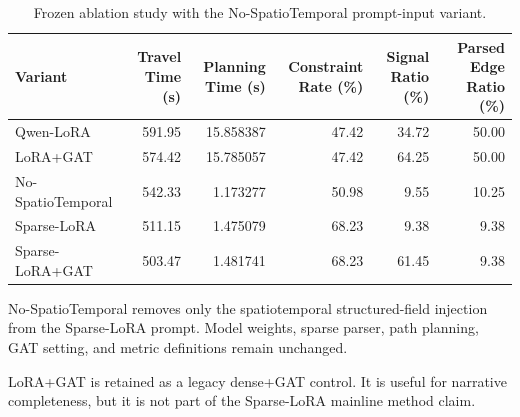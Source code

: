 
\begin{table}[t]
\centering
\caption{Frozen ablation study with the No-SpatioTemporal prompt-input variant.}
\label{tab:table2_ablation}
\small
\begin{threeparttable}
\begin{tabular}{lrrrrr}
\toprule
Variant & Travel Time (s) & Planning Time (s) & Constraint Rate (\%) & Signal Ratio (\%) & Parsed Edge Ratio (\%) \\
\midrule
Qwen-LoRA & 591.95 & 15.858387 & 47.42 & 34.72 & 50.00 \\
LoRA+GAT & 574.42 & 15.785057 & 47.42 & 64.25 & 50.00 \\
No-SpatioTemporal & 542.33 & 1.173277 & 50.98 & 9.55 & 10.25 \\
Sparse-LoRA & 511.15 & 1.475079 & 68.23 & 9.38 & 9.38 \\
Sparse-LoRA+GAT & 503.47 & 1.481741 & 68.23 & 61.45 & 9.38 \\
\bottomrule
\end{tabular}
\begin{tablenotes}[flushleft]
\footnotesize
\item No-SpatioTemporal removes only the spatiotemporal structured-field injection from the Sparse-LoRA prompt. Model weights, sparse parser, path planning, GAT setting, and metric definitions remain unchanged.
\item LoRA+GAT is retained as a legacy dense+GAT control. It is useful for narrative completeness, but it is not part of the Sparse-LoRA mainline method claim.
\end{tablenotes}
\end{threeparttable}
\end{table}
